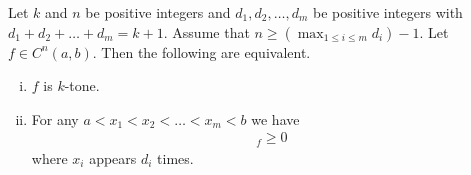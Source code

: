 \begin{lem}
	Let $k$ and $n$ be positive integers and $d_{1}, d_{2}, \ldots, d_{m}$ be positive integers with $d_{1} + d_{2} + \ldots + d_{m} = k + 1$. Assume that $n \geq \left(\max_{1 \leq i \leq m} d_{i} \right) - 1$. Let $f \in C^{n}(a, b)$. Then the following are equivalent.
	\begin{enumerate}[(i)]
		\item $f$ is $k$-tone.
		\item For any $a < x_{1} < x_{2} < \ldots < x_{m} < b$ we have
		\begin{align*}
			[x_{1}, x_{1}, \ldots, x_{1}, x_{2}, \ldots, x_{2}, \ldots, x_{m}, \ldots, x_{m}]_{f} \geq 0
		\end{align*}
		where $x_{i}$ appears $d_{i}$ times.
	\end{enumerate}
\end{lem}

